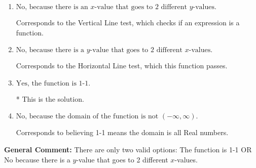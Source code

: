 \documentclass{extbook}[14pt]
\begin{document}
\begin{enumerate}
{\begin{enumerate}[label=\Alph*.]
Corresponds to believing 1-1 means the range is all Real numbers.
\item \( \text{No, because there is an $x$-value that goes to 2 different $y$-values.} \)

Corresponds to the Vertical Line test, which checks if an expression is a function.
\item \( \text{No, because there is a $y$-value that goes to 2 different $x$-values.} \)

Corresponds to the Horizontal Line test, which this function passes.
\item \( \text{Yes, the function is 1-1.} \)

* This is the solution.
\item \( \text{No, because the domain of the function is not $(-\infty, \infty)$.} \)

Corresponds to believing 1-1 means the domain is all Real numbers.
\end{enumerate}

\textbf{General Comment:} There are only two valid options: The function is 1-1 OR No because there is a $y$-value that goes to 2 different $x$-values.
}
\end{enumerate}
\end{document}
